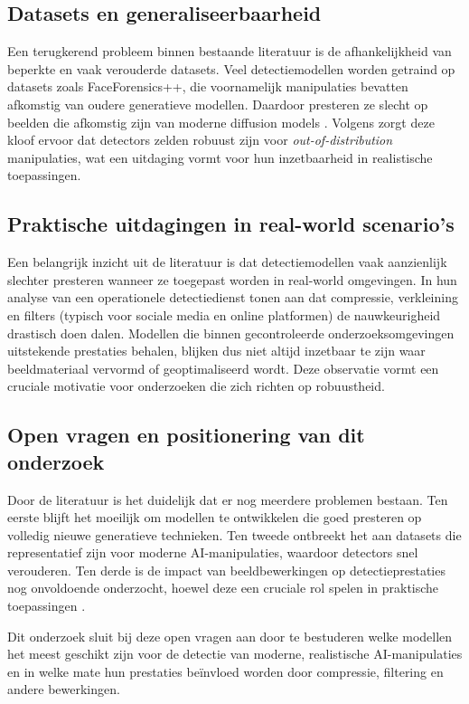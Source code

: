 \documentclass{hogent-article}
\begin{document}
\subsection{Datasets en generaliseerbaarheid}
Een terugkerend probleem binnen bestaande literatuur is de afhankelijkheid van beperkte en vaak verouderde datasets. Veel detectiemodellen worden getraind op datasets zoals FaceForensics++, die voornamelijk manipulaties bevatten afkomstig van oudere generatieve modellen. Daardoor presteren ze slecht op beelden die afkomstig zijn van moderne diffusion models \autocite{Gong2024}. Volgens \textcite{Akhtar2023} zorgt deze kloof ervoor dat detectors zelden robuust zijn voor \emph{out-of-distribution} manipulaties, wat een uitdaging vormt voor hun inzetbaarheid in realistische toepassingen.

\subsection{Praktische uitdagingen in real-world scenario's}
Een belangrijk inzicht uit de literatuur is dat detectiemodellen vaak aanzienlijk slechter presteren wanneer ze toegepast worden in real-world omgevingen. In hun analyse van een operationele detectiedienst tonen \textcite{Baxevanakis2022} aan dat compressie, verkleining en filters (typisch voor sociale media en online platformen) de nauwkeurigheid drastisch doen dalen. Modellen die binnen gecontroleerde onderzoeksomgevingen uitstekende prestaties behalen, blijken dus niet altijd inzetbaar te zijn waar beeldmateriaal vervormd of geoptimaliseerd wordt. Deze observatie vormt een cruciale motivatie voor onderzoeken die zich richten op robuustheid.

\subsection{Open vragen en positionering van dit onderzoek}
Door de literatuur is het duidelijk dat er nog meerdere problemen bestaan. Ten eerste blijft het moeilijk om modellen te ontwikkelen die goed presteren op volledig nieuwe generatieve technieken. Ten tweede ontbreekt het aan datasets die representatief zijn voor moderne AI-manipulaties, waardoor detectors snel verouderen. Ten derde is de impact van beeldbewerkingen op detectieprestaties nog onvoldoende onderzocht, hoewel deze een cruciale rol spelen in praktische toepassingen \autocite{Baxevanakis2022}. 

Dit onderzoek sluit bij deze open vragen aan door te bestuderen welke modellen het meest geschikt zijn voor de detectie van moderne, realistische AI-manipulaties en in welke mate hun prestaties beïnvloed worden door compressie, filtering en andere bewerkingen. 
\end{document}
